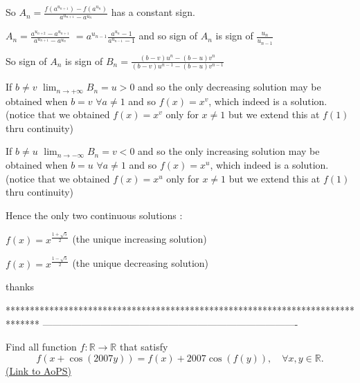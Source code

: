 \begin{solution}
So $ A_n = \frac {f(a^{u_{n + 1}}) - f(a^{u_n})}{a^{u_{n + 1}} - a^{u_n}}$ has a constant sign.

$ A_n = \frac {a^{u_{n + 2}} - a^{u_{n + 1}}}{a^{u_{n + 1}} - a^{u_n}}$ $ = a^{u_{n - 1}}\frac {a^{u_n} - 1}{a^{u_{n - 1}} - 1}$ and so sign of $ A_n$ is sign of $ \frac {u_n}{u_{n - 1}}$

So sign of $ A_n$ is sign of $ B_n = \frac {(b - v)u^n - (b - u)v^n}{(b - v)u^{n - 1} - (b - u)v^{n - 1}}$

If $ b\ne v$ $ \lim_{n\to + \infty}B_n = u > 0$ and so the only decreasing solution may be obtained when $ b = v$ $ \forall a\ne 1$ and so $ f(x) = x^v$, which indeed is a solution.
(notice that we obtained $ f(x) = x^v$ only for $ x\ne 1$ but we extend this at $ f(1)$ thru continuity)

If $ b\ne u$ $ \lim_{n\to - \infty}B_n = v < 0$ and so the only increasing solution may be obtained when $ b = u$ $ \forall a\ne 1$ and so $ f(x) = x^u$, which indeed is a solution.
(notice that we obtained $ f(x) = x^u$ only for $ x\ne 1$ but we extend this at $ f(1)$ thru continuity)

Hence the only two continuous solutions :

$ f(x) = x^{\frac {1 + \sqrt 5}2}$ (the unique increasing solution)

$ f(x) = x^{\frac {1 - \sqrt 5}2}$ (the unique decreasing solution)
\end{solution}



\begin{solution}
	thanks  
\end{solution}
*******************************************************************************
-------------------------------------------------------------------------------

\begin{problem}
	Find all function $ f: \mathbb R \to \mathbb R$ that satisfy \[ f(x + \cos(2007y))=f(x)+2007\cos(f(y)),\quad \forall x,y\in \mathbb R.\]
	\flushright \href{https://artofproblemsolving.com/community/c6h314367}{(Link to AoPS)}
\end{problem}




